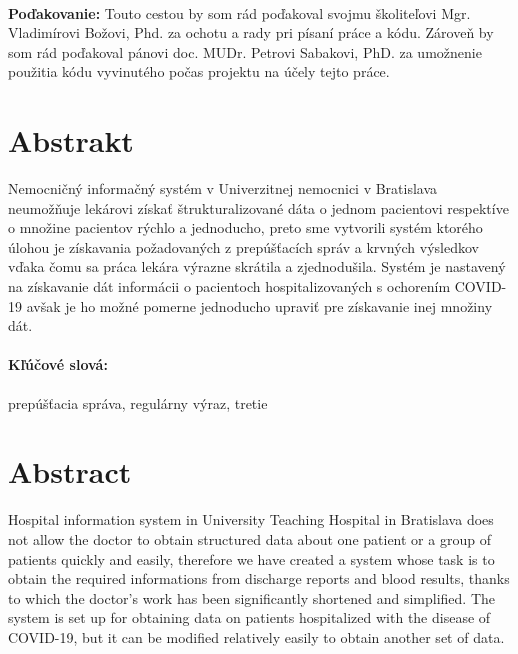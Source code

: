 \documentclass[12pt, twoside]{book}
\begin{document}


\newpage 
\pagestyle{plain}
~

\vfill
{\bf Poďakovanie:} Touto cestou by som rád poďakoval svojmu školiteľovi Mgr. Vladimírovi Božovi, Phd. za ochotu a rady pri písaní práce a kódu. Zároveň by som rád poďakoval pánovi doc. MUDr. Petrovi Sabakovi, PhD. za umožnenie použitia kódu vyvinutého počas projektu na účely tejto práce.  


\newpage 
\section*{Abstrakt}


Nemocničný informačný systém v Univerzitnej nemocnici v Bratislava neumožňuje lekárovi získať štrukturalizované dáta o jednom pacientovi respektíve o množine pacientov rýchlo a jednoducho, preto sme vytvorili systém ktorého úlohou je získavania požadovaných z prepúšťacích správ a krvných výsledkov vďaka čomu sa práca lekára výrazne skrátila a zjednodušila. Systém je nastavený na získavanie dát informácii o pacientoch hospitalizovaných s ochorením COVID-19 avšak je ho možné pomerne jednoducho upraviť pre získavanie inej množiny dát. 

\paragraph*{Kľúčové slová:} prepúšťacia správa, regulárny výraz, tretie 


\newpage 
\section*{Abstract}

Hospital information system in University Teaching Hospital in Bratislava does not allow the doctor to obtain structured data about one patient or a group of patients quickly and easily, therefore we have created a system whose task is to obtain the required informations from discharge reports and blood results, thanks to which the doctor's work has been significantly shortened and simplified. The system is set up for obtaining data on patients hospitalized with the disease of COVID-19, but it can be modified relatively easily to obtain another set of data.
\end{document}
